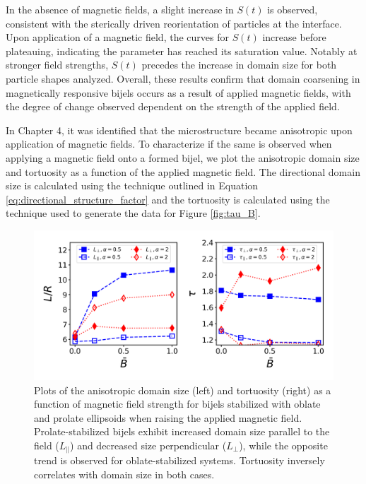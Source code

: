 In the absence of magnetic fields, a slight increase in $S(t)$ is observed, consistent with the sterically driven reorientation of particles at the interface.
\cite{gunther_timescales_2014} Upon application of a magnetic field, the curves for \(S(t)\) increase before plateauing, indicating the parameter has reached
its saturation value. Notably at stronger field strengths, $S(t)$ precedes the increase in domain size for both particle shapes analyzed. Overall, these results 
confirm that domain coarsening in magnetically responsive bijels occurs as a result of applied magnetic fields, with the degree of change observed dependent 
on the strength of the applied field. 

In Chapter 4, it was identified that the microstructure became anisotropic upon application of magnetic fields. To characterize if the same is observed
when applying a magnetic field onto a formed bijel, we plot the anisotropic domain size and tortuosity as a function of the applied magnetic field. The
directional domain size is calculated using the technique outlined in Equation \ref{eq:directional_structure_factor} and the tortuosity is calculated
using the technique used to generate the data for Figure \ref{fig:tau_B}.

\begin{figure} 
    \centering 
    \includegraphics[scale=0.6]{../figures/results/paper2/domain_size_aniso-field_on.png} 
    \caption{Plots of the anisotropic domain size (left) and tortuosity (right) as a function of magnetic field strength for bijels 
             stabilized with oblate and prolate ellipsoids when raising the applied magnetic field. Prolate-stabilized bijels 
             exhibit increased domain size parallel to the field ($L_{\parallel}$) and decreased size perpendicular ($L_{\perp}$), 
             while the opposite trend is observed for oblate-stabilized systems. Tortuosity inversely correlates with domain size in 
             both cases.} 
    \label{fig:domain_size_aniso-field_on} 
\end{figure}

